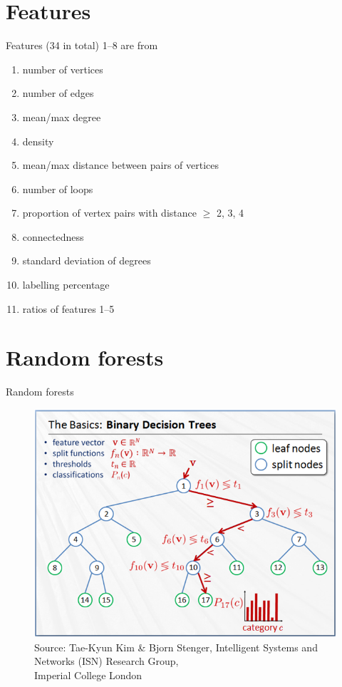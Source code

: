 \documentclass{beamer}
\begin{document}
\section{Features}
\begin{frame}{Features (34 in total)}
  1--8 are from \cite{DBLP:conf/lion/KotthoffMS16}
  \begin{enumerate}
  \item number of vertices
  \item number of edges
  \item mean/max degree
  \item density
  \item mean/max distance between pairs of vertices
  \item number of loops
  \item proportion of vertex pairs with distance $\ge$ 2, 3, 4
  \item connectedness
  \item standard deviation of degrees
  \item labelling percentage
  \item ratios of features 1--5
  \end{enumerate}
\end{frame}

\section{Random forests}
\begin{frame}{Random forests \parencite{DBLP:journals/ml/Breiman01}}
  \begin{figure}
    \centering
    \includegraphics[scale=0.5]{random_forests_2.png} \\
    {\tiny\color{gray}Source: Tae-Kyun Kim \& Bjorn Stenger, Intelligent Systems and Networks (ISN) Research Group,\\[-7pt] Imperial College London}
  \end{figure}
\end{frame}
\end{document}
